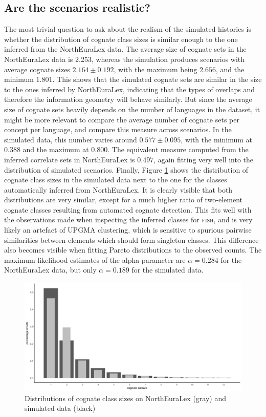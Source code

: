 \subsection{Are the scenarios realistic?}
The most trivial question to ask about the realism of the simulated histories is whether the distribution of cognate class sizes is similar enough to the one inferred from the NorthEuraLex data. The average size of cognate sets in the NorthEuraLex data is 2.253, whereas the simulation produces scenarios with average cognate sizes $2.164 \pm 0.192$, with the maximum being $2.656$, and the minimum $1.801$. This shows that the simulated cognate sets are similar in the size to the ones inferred by NorthEuraLex, indicating that the types of overlaps and therefore the information geometry will behave similarly. But since the average size of cognate sets heavily depends on the number of languages in the dataset, it might be more relevant to compare the average number of cognate sets per concept per language, and compare this measure across scenarios. In the simulated data, this number varies around $0.577 \pm 0.095$, with the minimum at $0.388$ and the maximum at $0.800$. The equivalent measure computed from the 
inferred correlate sets in NorthEuraLex is $0.497$, again fitting very well into the distribution of simulated scenarios. Finally, Figure \ref{cognate-class-sizes} shows the distribution of cognate class sizes in the simulated data next to the one for the classes automatically inferred from NorthEuraLex. It is clearly visible that both distributions are very similar, except for a much higher ratio of two-element cognate classes resulting from automated cognate detection. This fits well with the observations made when inspecting the inferred classes for \textsc{fish}, and is very likely an artefact of UPGMA clustering, which is sensitive to spurious pairwise similarities between elements which should form singleton classes. This difference also becomes visible when fitting Pareto distributions to the observed counts. The maximum likelihood estimates of the alpha parameter are $\alpha = 0.284$ for the NorthEuraLex data, but only $\alpha = 0.189$ for the simulated data. 

\begin{figure}
 \begin{center}
 \includegraphics[width=\textwidth]{figures/cognate-set-sizes.pdf}
 \caption{Distributions of cognate class sizes on NorthEuraLex (gray) and simulated data (black)}
 \label{cognate-class-sizes}
 \end{center}
\end{figure}

